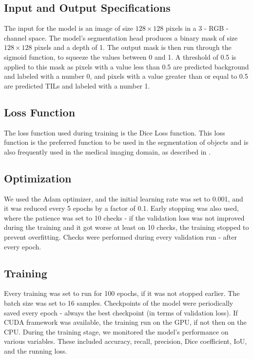 \subsection{Input and Output Specifications}
The input for the model is an image of size $128\times128$ pixels in a 3 - RGB - channel space. The model's segmentation head produces a binary mask of size $128\times128$ pixels and a depth of 1. The output mask is then run through the sigmoid function, to squeeze the values between 0 and 1. A threshold of 0.5 is applied to this mask as pixels with a value less than 0.5 are predicted background and labeled with a number 0, and pixels with a value greater than or equal to 0.5 are predicted TILs and labeled with a number 1.

\subsection{Loss Function}
The loss function used during training is the Dice Loss function. This loss function is the preferred function to be used in the segmentation of objects and is also frequently used in the medical imaging domain, as described in \cite{Zhang2021}.

\subsection{Optimization}
We used the Adam optimizer, and the initial learning rate was set to 0.001, and it was reduced every 5 epochs by a factor of 0.1. Early stopping was also used, where the patience was set to 10 checks - if the validation loss was not improved during the training and it got worse at least on 10 checks, the training stopped to prevent overfitting. Checks were performed during every validation run - after every epoch.

\subsection{Training}
Every training was set to run for 100 epochs, if it was not stopped earlier. The batch size was set to 16 samples. Checkpoints of the model were periodically saved every epoch - always the best checkpoint (in terms of validation loss). If CUDA framework was available, the training run on the GPU, if not then on the CPU. During the training stage, we monitored the model's performance on various variables. These included accuracy, recall, precision, Dice coefficient, IoU, and the running loss.

